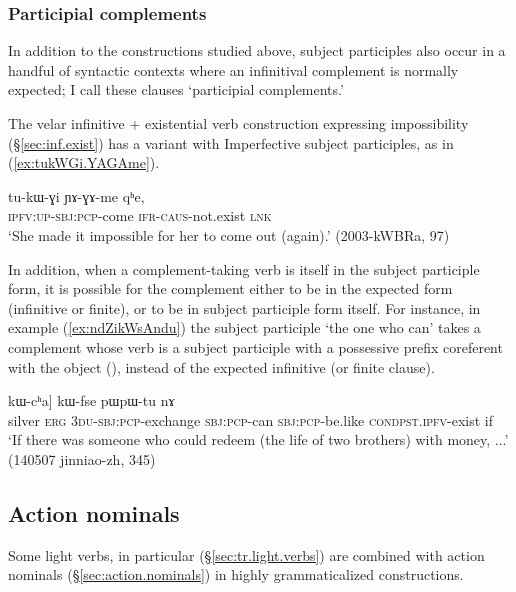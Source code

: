 \subsubsection{Participial complements} \label{sec:participial.complements.negative}
In addition to the constructions studied above, subject participles also occur in a handful of syntactic contexts where an infinitival complement is normally expected; I call these clauses `participial complements.'

The velar infinitive + existential verb construction expressing impossibility (§\ref{sec:inf.exist}) has a variant with Imperfective subject participles, as in (\ref{ex:tukWGi.YAGAme}). 

\begin{exe}
	\ex \label{ex:tukWGi.YAGAme}
	\gll   tu-kɯ-ɣi ɲɤ-ɣɤ-me qʰe,  \\
	\textsc{ipfv}:\textsc{up}-\textsc{sbj}:\textsc{pcp}-come \textsc{ifr}-\textsc{caus}-not.exist \textsc{lnk} \\
	\glt `She made it impossible for her to come out (again).' (2003-kWBRa, 97)
\end{exe}

In addition, when a complement-taking verb is itself in the subject participle form, it is possible for the complement either to be in the expected form (infinitive or finite), or to be in subject participle form itself. For instance, in example (\ref{ex:ndZikWsAndu}) the subject participle  `the one who can' takes a complement whose verb is a subject participle with a possessive prefix coreferent with the object (), instead of the expected  infinitive (or finite clause).

\begin{exe}
	\ex \label{ex:ndZikWsAndu}
	\gll  [[rŋɯl kɯ ndʑi-kɯ-sɤndu] kɯ-cʰa] kɯ-fse pɯ\redp{}pɯ-tu nɤ  \\
	silver \textsc{erg} \textsc{3du}-\textsc{sbj}:\textsc{pcp}-exchange \textsc{sbj}:\textsc{pcp}-can \textsc{sbj}:\textsc{pcp}-be.like 
	\textsc{cond}\redp{}\textsc{pst}.\textsc{ipfv}-exist if \\
	\glt `If there was someone who could redeem (the life of two brothers) with money, ...' (140507 jinniao-zh, 345)
\end{exe}

\subsection{Action nominals}   \label{sec:complementation.strategy.action.nominals}
Some light verbs, in particular   (§\ref{sec:tr.light.verbs}) are combined with action nominals (§\ref{sec:action.nominals}) in highly grammaticalized constructions.

